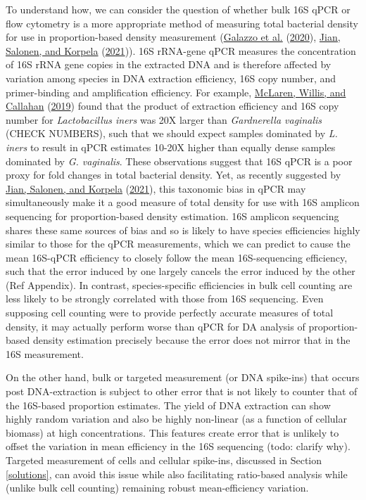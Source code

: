 \documentclass[
]{article}
\theoremstyle{definition}
\theoremstyle{definition}
\theoremstyle{definition}
\theoremstyle{definition}
\theoremstyle{remark}
\begin{document}
To understand how, we can consider the question of whether bulk 16S qPCR or flow cytometry is a more appropriate method of measuring total bacterial density for use in proportion-based density measurement (\protect\hyperlink{ref-galazzo2020howt}{Galazzo et al.} (\protect\hyperlink{ref-galazzo2020howt}{2020}), \protect\hyperlink{ref-jian2021comm}{Jian, Salonen, and Korpela} (\protect\hyperlink{ref-jian2021comm}{2021})).
16S rRNA-gene qPCR measures the concentration of 16S rRNA gene copies in the extracted DNA and is therefore affected by variation among species in DNA extraction efficiency, 16S copy number, and primer-binding and amplification efficiency.
For example, \protect\hyperlink{ref-mclaren2019cons}{McLaren, Willis, and Callahan} (\protect\hyperlink{ref-mclaren2019cons}{2019}) found that the product of extraction efficiency and 16S copy number for \emph{Lactobacillus iners} was 20X larger than \emph{Gardnerella vaginalis} (CHECK NUMBERS), such that we should expect samples dominated by \emph{L. iners} to result in qPCR estimates 10-20X higher than equally dense samples dominated by \emph{G. vaginalis}.
These observations suggest that 16S qPCR is a poor proxy for fold changes in total bacterial density.
Yet, as recently suggested by \protect\hyperlink{ref-jian2021comm}{Jian, Salonen, and Korpela} (\protect\hyperlink{ref-jian2021comm}{2021}), this taxonomic bias in qPCR may simultaneously make it a good measure of total density for use with 16S amplicon sequencing for proportion-based density estimation.
16S amplicon sequencing shares these same sources of bias and so is likely to have species efficiencies highly similar to those for the qPCR measurements, which we can predict to cause the mean 16S-qPCR efficiency to closely follow the mean 16S-sequencing efficiency, such that the error induced by one largely cancels the error induced by the other (Ref Appendix).
In contrast, species-specific efficiencies in bulk cell counting are less likely to be strongly correlated with those from 16S sequencing.
Even supposing cell counting were to provide perfectly accurate measures of total density, it may actually perform worse than qPCR for DA analysis of proportion-based density estimation precisely because the error does not mirror that in the 16S measurement.

On the other hand, bulk or targeted measurement (or DNA spike-ins) that occurs post DNA-extraction is subject to other error that is not likely to counter that of the 16S-based proportion estimates.
The yield of DNA extraction can show highly random variation and also be highly non-linear (as a function of cellular biomass) at high concentrations.
This features create error that is unlikely to offset the variation in mean efficiency in the 16S sequencing (todo: clarify why).
Targeted measurement of cells and cellular spike-ins, discussed in Section \ref{solutions}, can avoid this issue while also facilitating ratio-based analysis while (unlike bulk cell counting) remaining robust mean-efficiency variation.
\end{document}
